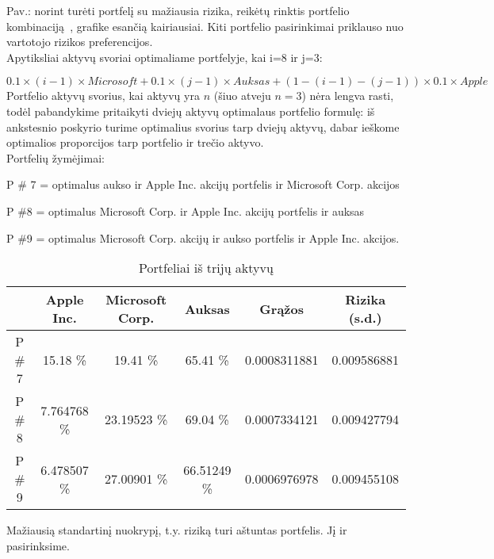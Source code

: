 \documentclass[12pt, a14paper, lithuanian]{article}
\begin{document}
Pav.: norint turėti portfelį su mažiausia rizika, reikėtų rinktis portfelio kombinaciją~\cite{cope}, grafike esančią kairiausiai. Kiti portfelio pasirinkimai priklauso nuo vartotojo rizikos preferencijos. \\

Apytiksliai aktyvų svoriai optimaliame portfelyje, kai i=8 ir j=3:

$ 0.1 \times (i-1) \times Microsoft + 0.1 \times (j-1) \times Auksas + (1 - (i-1) - (j-1)) \times  0.1 \times Apple$ \\



Portfelio aktyvų svorius, kai aktyvų yra $n$ (šiuo atveju $n=3$) nėra lengva rasti, todėl pabandykime pritaikyti dviejų aktyvų optimalaus portfelio formulę: iš ankstesnio poskyrio turime optimalius svorius tarp dviejų aktyvų, dabar ieškome optimalios proporcijos tarp portfelio ir trečio aktyvo. \\


Portfelių žymėjimai:

P \# 7 = optimalus aukso ir Apple Inc. akcijų portfelis ir Microsoft Corp. akcijos

P \#8 = optimalus Microsoft Corp. ir Apple Inc. akcijų portfelis ir auksas

P \#9 = optimalus Microsoft Corp. akcijų ir aukso portfelis ir Apple Inc. akcijos.

\begin{table}[ht]
\begin{center}
\begin{tabular}{cccccc}
  \hline
  & Apple Inc. & Microsoft Corp. & Auksas & Grąžos & Rizika (s.d.) \\ 
  \hline
P \# 7 & 15.18 \% & 19.41 \% & 65.41 \% & 0.0008311881 & 0.009586881 &\\
\hline
 P \# 8 & 7.764768 \% & 23.19523 \% & 69.04 \% & 0.0007334121 & 0.009427794 &\\ 
\hline
P \# 9 & 6.478507 \% & 27.00901 \% & 66.51249 \% & 0.0006976978 & 0.009455108 &\\
\hline

\end{tabular}
\end{center}
\caption{Portfeliai iš trijų aktyvų}
\end{table}


 Mažiausią standartinį nuokrypį, t.y. riziką turi aštuntas portfelis. Jį ir pasirinksime.
\\
\end{document}
